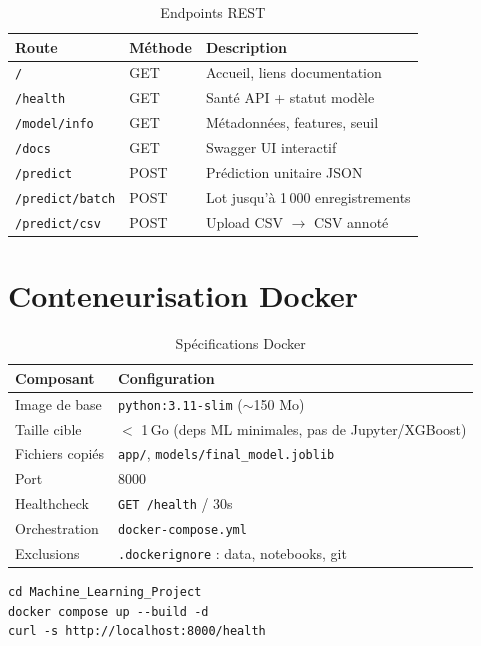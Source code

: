 \documentclass[11pt,a4paper,twoside,openright]{report}
\begin{document}
\begin{table}[H]
  \centering
  \caption{Endpoints REST}
  \label{tab:endpoints}
  \begin{tabular}{llp{6.5cm}}
    \toprule
    \textbf{Route} & \textbf{Méthode} & \textbf{Description} \\
    \midrule
    \texttt{/} & GET & Accueil, liens documentation \\
    \texttt{/health} & GET & Santé API + statut modèle \\
    \texttt{/model/info} & GET & Métadonnées, features, seuil \\
    \texttt{/docs} & GET & Swagger UI interactif \\
    \texttt{/predict} & POST & Prédiction unitaire JSON \\
    \texttt{/predict/batch} & POST & Lot jusqu'à 1\,000 enregistrements \\
    \texttt{/predict/csv} & POST & Upload CSV $\rightarrow$ CSV annoté \\
    \bottomrule
  \end{tabular}
\end{table}

\section{Conteneurisation Docker}

\begin{table}[H]
  \centering
  \caption{Spécifications Docker}
  \label{tab:docker}
  \begin{tabular}{lp{8cm}}
    \toprule
    \textbf{Composant} & \textbf{Configuration} \\
    \midrule
    Image de base & \texttt{python:3.11-slim} ($\sim$150 Mo) \\
    Taille cible & $<$ 1\,Go (deps ML minimales, pas de Jupyter/XGBoost) \\
    Fichiers copiés & \texttt{app/}, \texttt{models/final\_model.joblib} \\
    Port & 8000 \\
    Healthcheck & \texttt{GET /health} / 30s \\
    Orchestration & \texttt{docker-compose.yml} \\
    Exclusions & \texttt{.dockerignore} : data, notebooks, git \\
    \bottomrule
  \end{tabular}
\end{table}

\begin{lstlisting}[style=bash, caption={Déploiement}]
cd Machine_Learning_Project
docker compose up --build -d
curl -s http://localhost:8000/health
\end{lstlisting}
\end{document}
